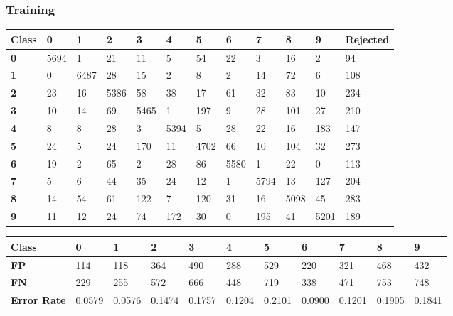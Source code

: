 \documentclass[
  a4paper,            %
  DIV=10,             %
  oneside,            %
  BCOR=5mm,           %
  parskip=half,       %
  numbers=noenddot,   %
  bibtotoc,           %
  listof=totoc,        %
  article
]{scrreprt}
\begin{document}
\subsubsection{Training}
\begin{center}
  \begin{tabular}{|p{1cm}|p{1cm}|p{1cm}|p{1cm}|p{1cm}|p{1cm}|p{1cm}|p{1cm}|p{1cm}|p{1cm}|p{1cm}|p{1.7cm}|}
    \hline
    \textbf{Class} & \textbf{0} & \textbf{1} & \textbf{2} & \textbf{3} & \textbf{4} & \textbf{5} & \textbf{6} & \textbf{7} & \textbf{8} & \textbf{9} & \textbf{Rejected} \\
    \hline
    \textbf{0} & 5694 & 1 & 21 & 11 & 5 & 54 & 22 & 3 & 16 & 2 & 94 \\
    \hline
    \textbf{1} & 0 & 6487 & 28 & 15 & 2 & 8 & 2 & 14 & 72 & 6 & 108 \\
    \hline
    \textbf{2} & 23 & 16 & 5386 & 58 & 38 & 17 & 61 & 32 & 83 & 10 & 234 \\
    \hline
    \textbf{3} & 10 & 14 & 69 & 5465 & 1 & 197 & 9 & 28 & 101 & 27 & 210 \\
    \hline
    \textbf{4} & 8 & 8 & 28 & 3 & 5394 & 5 & 28 & 22 & 16 & 183 & 147 \\
    \hline
    \textbf{5} & 24 & 5 & 24 & 170 & 11 & 4702 & 66 & 10 & 104 & 32 & 273 \\
    \hline
    \textbf{6} & 19 & 2 & 65 & 2 & 28 & 86 & 5580 & 1 & 22 & 0 & 113 \\
    \hline
    \textbf{7} & 5 & 6 & 44 & 35 & 24 & 12 & 1 & 5794 & 13 & 127 & 204 \\
    \hline
    \textbf{8} & 14 & 54 & 61 & 122 & 7 & 120 & 31 & 16 & 5098 & 45 & 283 \\
    \hline
    \textbf{9} & 11 & 12 & 24 & 74 & 172 & 30 & 0 & 195 & 41 & 5201 & 189 \\
    \hline
  \end{tabular}
\end{center}

\begin{center}
  \begin{tabular}{|p{1cm}|p{1cm}|p{1cm}|p{1cm}|p{1cm}|p{1cm}|p{1cm}|p{1cm}|p{1cm}|p{1cm}|p{1cm}|}
    \hline
    \textbf{Class} & \textbf{0} & \textbf{1} & \textbf{2} & \textbf{3} & \textbf{4} & \textbf{5} & \textbf{6} & \textbf{7} & \textbf{8} & \textbf{9} \\
    \hline
    \textbf{FP} & 114 & 118 & 364 & 490 & 288 & 529 & 220 & 321 & 468 & 432 \\
    \hline
    \textbf{FN} & 229 & 255 & 572 & 666 & 448 & 719 & 338 & 471 & 753 & 748 \\
    \hline
    \textbf{Error Rate} & 0.0579 & 0.0576 & 0.1474 & 0.1757 & 0.1204 & 0.2101 & 0.0900 & 0.1201 & 0.1905 & 0.1841 \\
    \hline
  \end{tabular}
\end{center}
\end{document}

